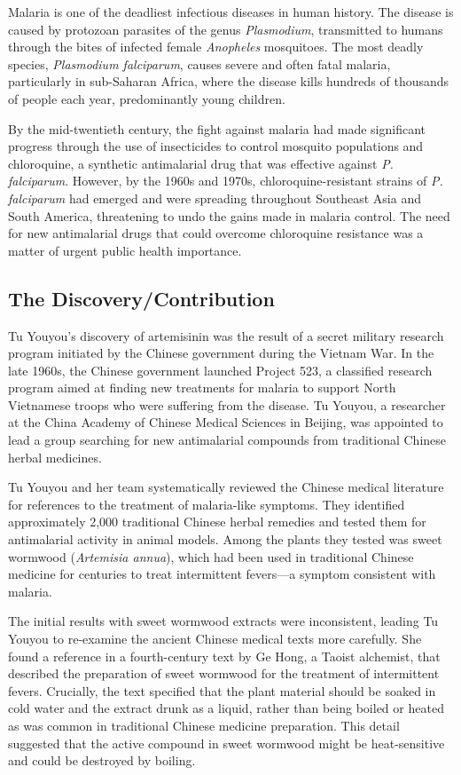 Malaria is one of the deadliest infectious diseases in human history. The disease is caused by protozoan parasites of the genus \textit{Plasmodium}, transmitted to humans through the bites of infected female \textit{Anopheles} mosquitoes. The most deadly species, \textit{Plasmodium falciparum}, causes severe and often fatal malaria, particularly in sub-Saharan Africa, where the disease kills hundreds of thousands of people each year, predominantly young children.

By the mid-twentieth century, the fight against malaria had made significant progress through the use of insecticides to control mosquito populations and chloroquine, a synthetic antimalarial drug that was effective against \textit{P. falciparum}. However, by the 1960s and 1970s, chloroquine-resistant strains of \textit{P. falciparum} had emerged and were spreading throughout Southeast Asia and South America, threatening to undo the gains made in malaria control. The need for new antimalarial drugs that could overcome chloroquine resistance was a matter of urgent public health importance.

\subsection{The Discovery/Contribution}

Tu Youyou's discovery of artemisinin was the result of a secret military research program initiated by the Chinese government during the Vietnam War. In the late 1960s, the Chinese government launched Project 523, a classified research program aimed at finding new treatments for malaria to support North Vietnamese troops who were suffering from the disease. Tu Youyou, a researcher at the China Academy of Chinese Medical Sciences in Beijing, was appointed to lead a group searching for new antimalarial compounds from traditional Chinese herbal medicines.

Tu Youyou and her team systematically reviewed the Chinese medical literature for references to the treatment of malaria-like symptoms. They identified approximately 2,000 traditional Chinese herbal remedies and tested them for antimalarial activity in animal models. Among the plants they tested was sweet wormwood (\textit{Artemisia annua}), which had been used in traditional Chinese medicine for centuries to treat intermittent fevers---a symptom consistent with malaria.

The initial results with sweet wormwood extracts were inconsistent, leading Tu Youyou to re-examine the ancient Chinese medical texts more carefully. She found a reference in a fourth-century text by Ge Hong, a Taoist alchemist, that described the preparation of sweet wormwood for the treatment of intermittent fevers. Crucially, the text specified that the plant material should be soaked in cold water and the extract drunk as a liquid, rather than being boiled or heated as was common in traditional Chinese medicine preparation. This detail suggested that the active compound in sweet wormwood might be heat-sensitive and could be destroyed by boiling.


